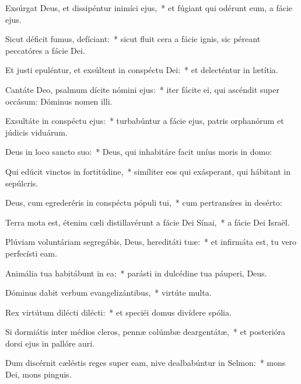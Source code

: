 \item Exsúrgat Deus, et dissipéntur inimíci ejus,~* et fúgiant qui odérunt eum, a fácie ejus.

\item Sicut déficit fumus, defíciant:~* sicut fluit cera a fácie ignis, sic péreant peccatóres a fácie Dei.

\item Et justi epuléntur, et exsúltent in conspéctu Dei:~* et delecténtur in lætítia.

\item Cantáte Deo, psalmum dícite nómini ejus:~* iter fácite ei, qui ascéndit super occásum: Dóminus nomen illi.

\item Exsultáte in conspéctu ejus:~* turbabúntur a fácie ejus, patris orphanórum et júdicis viduárum.

\item Deus in loco sancto suo:~* Deus, qui inhabitáre facit uníus moris in domo:

\item Qui edúcit vinctos in fortitúdine,~* simíliter eos qui exásperant, qui hábitant in sepúlcris.

\item Deus, cum egrederéris in conspéctu pópuli tui,~* cum pertransíres in desérto:

\item Terra mota est, étenim cæli distillavérunt a fácie Dei Sínai,~* a fácie Dei Israël.

\item Plúviam voluntáriam segregábis, Deus, hereditáti tuæ:~* et infirmáta est, tu vero perfecísti eam.

\item Animália tua habitábunt in ea:~* parásti in dulcédine tua páuperi, Deus.

\item Dóminus dabit verbum evangelizántibus,~* virtúte multa.

\item Rex virtútum dilécti dilécti:~* et speciéi domus divídere spólia.

\item Si dormiátis inter médios cleros, pennæ colúmbæ deargentátæ,~* et posterióra dorsi ejus in pallóre auri.

\item Dum discérnit cæléstis reges super eam, nive dealbabúntur in Selmon:~* mons Dei, mons pinguis.

